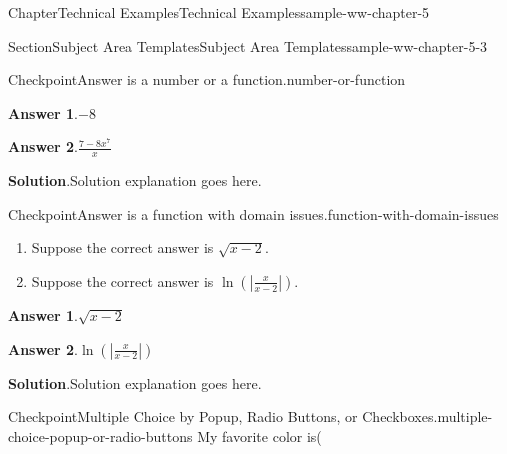 \documentclass[oneside,10pt,]{book}
\newcommand{\blocktitlefont}{\relax}
\newlength{\fillinmaxwidth}
\newlength{\fillincontract}
\newlength{\charmaxwidth}\setlength{\charmaxwidth}{0.5em}
\newlength{\charminwidth}\setlength{\charminwidth}{0.1em}
\newlength{\fillinheight}
\newcommand{\fillintext}[1]{%
\setlength{\fillinmaxwidth}{#1\charmaxwidth}%
\setlength{\fillincontract}{#1\charminwidth}%
\setlength{\fillinheight}{\baselineskip}\addtolength{\fillinheight}{1.2pt}%
\strut\nobreak\leaders\vbox{\hrule width 0.3pt height 0.3pt \vskip -1.2pt}\hskip 1\fillinmaxwidth minus \fillincontract\nobreak\strut%
}
\numberwithin{equation}{section}
\begin{document}
\begin{chapterptx}{Chapter}{Technical Examples}{}{Technical Examples}{}{}{sample-ww-chapter-5}
\begin{sectionptx}{Section}{Subject Area Templates}{}{Subject Area Templates}{}{}{sample-ww-chapter-5-3}
\begin{inlineexercise}{Checkpoint}{Answer is a number or a function.}{number-or-function}
\begin{enumerate}[label={\alph*.}]
%
\end{enumerate}
%
\par\smallskip%
\noindent\textbf{\blocktitlefont Answer 1}.\hypertarget{number-or-function-3}{}\quad{}\(-8\)%
\par\smallskip%
\noindent\textbf{\blocktitlefont Answer 2}.\hypertarget{number-or-function-4}{}\quad{}\(\frac{7-8x^{7}}{x}\)%
\par\smallskip%
\noindent\textbf{\blocktitlefont Solution}.\hypertarget{number-or-function-5}{}\quad{}Solution explanation goes here.%
\end{inlineexercise}%
\begin{inlineexercise}{Checkpoint}{Answer is a function with domain issues.}{function-with-domain-issues}%
%
\begin{enumerate}[label={\alph*.}]
\item{}Suppose the correct answer is \(\displaystyle {\sqrt{x-2}}\text{.}\)%
\par
%
%
\item{}Suppose the correct answer is \(\displaystyle {\ln\!\left(\left|\frac{x}{x-2}\right|\right)}\text{.}\)%
\par
%
%
\end{enumerate}
%
\par\smallskip%
\noindent\textbf{\blocktitlefont Answer 1}.\hypertarget{function-with-domain-issues-3}{}\quad{}\(\sqrt{x-2}\)%
\par\smallskip%
\noindent\textbf{\blocktitlefont Answer 2}.\hypertarget{function-with-domain-issues-4}{}\quad{}\(\ln\!\left(\left|\frac{x}{x-2}\right|\right)\)%
\par\smallskip%
\noindent\textbf{\blocktitlefont Solution}.\hypertarget{function-with-domain-issues-5}{}\quad{}Solution explanation goes here.%
\end{inlineexercise}%
\begin{inlineexercise}{Checkpoint}{Multiple Choice by Popup, Radio Buttons, or Checkboxes.}{multiple-choice-popup-or-radio-buttons}%
My favorite color is\quad(\begin{itemize*}[label=$\square$,leftmargin=3em,itemjoin=\hspace{1em}]

\end{itemize*}
\end{inlineexercise}
\end{sectionptx}
\end{chapterptx}
\end{document}
